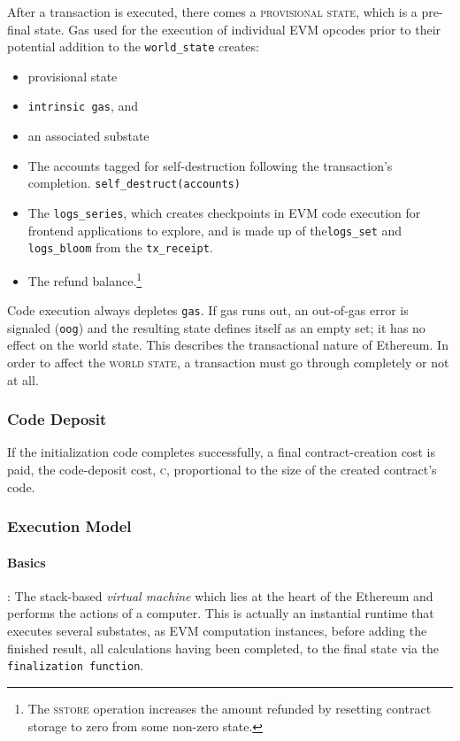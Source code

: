 \documentclass[10pt,letterpaper,leqno,bibliography=totoc]{scrartcl}
\newenvironment{alphafootnotes}
{\par\edef\savedfootnotenumber{\number\value{footnote}}
\renewcommand{\thefootnote}{\alph{footnote}}
\setcounter{footnote}{0}}
{\par\setcounter{footnote}{\savedfootnotenumber}}
\begin{document}
\begin{alphafootnotes}
\begin{multicols*}{2}
			After a transaction is executed, there comes a \textsc{provisional state}, which is a pre-final state. Gas used for the execution of individual EVM opcodes prior to their potential addition to the \texttt{world\_state} creates:
			
		\begin{itemize}
			\item provisional state
			\item \texttt{intrinsic gas}, and
			\item an associated substate  
		\end{itemize}
		
		\begin{itemize}
        		\item The accounts tagged for self-destruction following the transaction's completion. \texttt{self\_destruct(accounts)}
        		\item The \texttt{logs\_series}, which creates checkpoints in EVM code execution for frontend applications to explore, and is made up of the\texttt{logs\_set} and \texttt{logs\_bloom} from the \texttt{tx\_receipt}.
			\item The refund balance.\footnote{The \textsc{sstore} operation increases the amount refunded by resetting contract storage to zero from some non-zero state.}
		\end{itemize}

		Code execution always depletes \texttt{gas}. If gas runs out, an out-of-gas error is signaled (\texttt{oog}) and the resulting state defines itself as an empty set; it has no effect on the world state. This describes the transactional nature of Ethereum. In order to affect the \textsc{world state}, a transaction must go through completely or not at all. 

				\subsubsection{Code Deposit}
				If the initialization code completes successfully, a final contract-creation cost is paid, the code-deposit cost, \textsc{c}, proportional to the size of the created contract's code. 
	
				\subsubsection{Execution Model}
				\paragraph{Basics}: The stack-based \textsl{virtual machine} which lies at the heart of the Ethereum and performs the actions of a computer. This is actually an instantial runtime that executes several substates, as EVM computation instances, before adding the finished result, all calculations having been completed, to the final state  via the \texttt{finalization function}. 
	

\end{multicols*}
\end{alphafootnotes}
\end{document}
